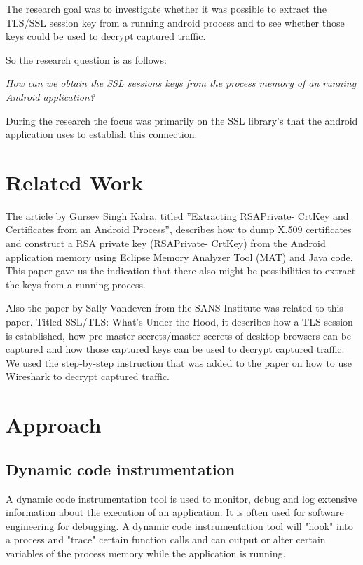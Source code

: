 \documentclass[12pt, a4paper]{report}
\begin{document}
The research goal was to investigate whether it was possible to extract the TLS/SSL session key from a running android process and to see whether those keys could be used to decrypt captured traffic. 

So the research question is as follows:

\begin{framed}
\noindent \textit{How can we obtain the SSL sessions keys from the process memory of an running Android application?}
\end{framed}

During the research the focus was primarily on the SSL library's that the android application uses to establish this connection.

\chapter{Related Work}
The article by Gursev Singh Kalra, titled ”Extracting RSAPrivate-
CrtKey and Certificates from an Android Process”, describes how to
dump X.509 certificates and construct a RSA private key (RSAPrivate-
CrtKey) from the Android application memory using Eclipse Memory
Analyzer Tool (MAT) and Java code. This paper gave us the indication that there also might be possibilities to extract the keys from a running
process.\cite{ref1}

Also the paper by Sally Vandeven from the SANS Institute was related to this paper. Titled SSL/TLS: What's Under the Hood, it describes how a TLS session is established, how pre-master secrets/master secrets of desktop browsers can be captured and how those captured keys can be used to decrypt captured traffic. We used the step-by-step instruction that was added to the paper on how to use Wireshark to decrypt captured traffic.\cite{ref2}

\chapter{Approach}
\section{Dynamic code instrumentation}

A dynamic code instrumentation tool is used to monitor, debug and log extensive information about the execution of an application. It is often used for software engineering for debugging. A dynamic code instrumentation tool will "hook" into a process and "trace" certain function calls and can output or alter certain variables of the process memory while the application is running.
\end{document}
